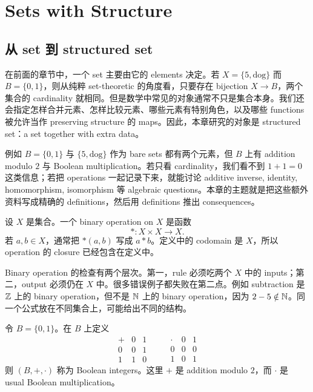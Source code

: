 \chapter{Sets with Structure}
\label{chap:sets-with-structure}

\section{从 set 到 structured set}

在前面的章节中，一个 set 主要由它的 elements 决定。若 \(X=\{5,\mathrm{dog}\}\) 而 \(B=\{0,1\}\)，则从纯粹 set-theoretic 的角度看，只要存在 bijection \(X\to B\)，两个集合的 cardinality 就相同。但是数学中常见的对象通常不只是集合本身。我们还会指定怎样合并元素、怎样比较元素、哪些元素有特别角色，以及哪些 functions 被允许当作 preserving structure 的 maps。因此，本章研究的对象是 structured set：a set together with extra data。

例如 \(B=\{0,1\}\) 与 \(\{5,\mathrm{dog}\}\) 作为 bare sets 都有两个元素，但 \(B\) 上有 addition modulo \(2\) 与 Boolean multiplication。若只看 cardinality，我们看不到 \(1+1=0\) 这类信息；若把 operations 一起记录下来，就能讨论 additive inverse, identity, homomorphism, isomorphism 等 algebraic questions。本章的主题就是把这些额外资料写成精确的 definitions，然后用 definitions 推出 consequences。

\begin{definition}
设 \(X\) 是集合。一个 binary operation on \(X\) 是函数
\[
  *:X\times X\to X.
\]
若 \(a,b\in X\)，通常把 \(*(a,b)\) 写成 \(a*b\)。定义中的 codomain 是 \(X\)，所以 operation 的 closure 已经包含在定义中。
\end{definition}

Binary operation 的检查有两个层次。第一，rule 必须吃两个 \(X\) 中的 inputs；第二，output 必须仍在 \(X\) 中。很多错误例子都失败在第二点。例如 subtraction 是 \(\mathbb{Z}\) 上的 binary operation，但不是 \(\mathbb{N}\) 上的 binary operation，因为 \(2-5\notin\mathbb{N}\)。同一个公式放在不同集合上，可能给出不同的结构。

\begin{definition}
令 \(B=\{0,1\}\)。在 \(B\) 上定义
\[
\begin{array}{c|cc}
+&0&1\\ \hline
0&0&1\\
1&1&0
\end{array}
\qquad
\begin{array}{c|cc}
\cdot&0&1\\ \hline
0&0&0\\
1&0&1
\end{array}
\]
则 \((B,+,\cdot)\) 称为 Boolean integers。这里 \(+\) 是 addition modulo \(2\)，而 \(\cdot\) 是 usual Boolean multiplication。
\end{definition}

